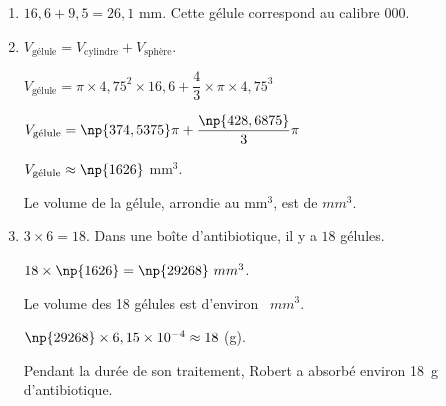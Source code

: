 \begin{enumerate}
\item %
$16,6 + 9,5 = 26,1$ mm. Cette gélule correspond au calibre 000.
\item %


$V_{\text{gélule}} = V_{\text{cylindre}} + V_{\text{sphère}}$.

$V_{\text{gélule}} = \pi \times 4,75^2 \times 16,6 + \dfrac{4}{3}
\times \pi \times  4,75^3$

$V_{\text{gélule}} = \np{374,5375}\pi + \dfrac{\np{428,6875}}{3}\pi$

$V_{\text{gélule}} \approx \np{1626}$ mm$^3$.

Le volume de la gélule, arrondie au mm$^3$, est de $mm^3$.
\item %

%
$3 \times 6 = 18$. Dans une boîte d’antibiotique, il y a $18$ gélules.

$18 \times \np{1626} = \np{29268}~mm^3$. 

Le volume des 18 gélules est d’environ ~$mm^3$.

$\np{29268}  \times 6,15 \times 10^{- 4} \approx  18~$(g).

Pendant la durée de son traitement, Robert a absorbé environ 18~g d’antibiotique.
\end{enumerate}
